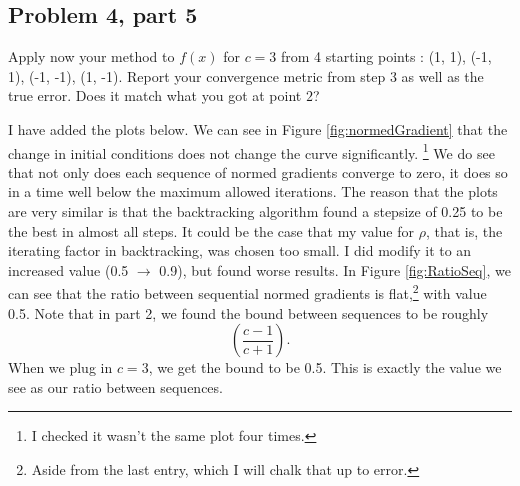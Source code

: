 \subsection{Problem 4, part 5}
Apply now your method to $f(x)$ for $c = 3$ from 4 starting points : (1, 1), (-1, 1), (-1, -1), (1, -1). Report your convergence metric from step 3 as well as the true error. Does it match what you got at point $2$?
\partbreak
\begin{solution}

    I have added the plots below. We can see in Figure \ref{fig:normedGradient} that the change in initial conditions does not change the curve significantly. \footnote{I checked it wasn't the same plot four times.} We do see that not only does each sequence of normed gradients converge to zero, it does so in a time well below the maximum allowed iterations. The reason that the plots are very similar is that the backtracking algorithm found a stepsize of 0.25 to be the best in almost all steps. It could be the case that my value for $\rho$, that is, the iterating factor in backtracking, was chosen too small. I did modify it to an increased value (0.5 $\rightarrow$ 0.9), but found worse results. In Figure \ref{fig:RatioSeq}, we can see that the ratio between sequential normed gradients is flat,\footnote{Aside from the last entry, which I will chalk that up to error.} with value 0.5. Note that in part 2, we found the bound between sequences to be roughly
    \[
    \left ( \frac{c-1}{c+1} \right).
    \]
    When we plug in $c = 3$, we get the bound to be 0.5. This is exactly the value we see as our ratio between sequences. 
    
\end{solution}

